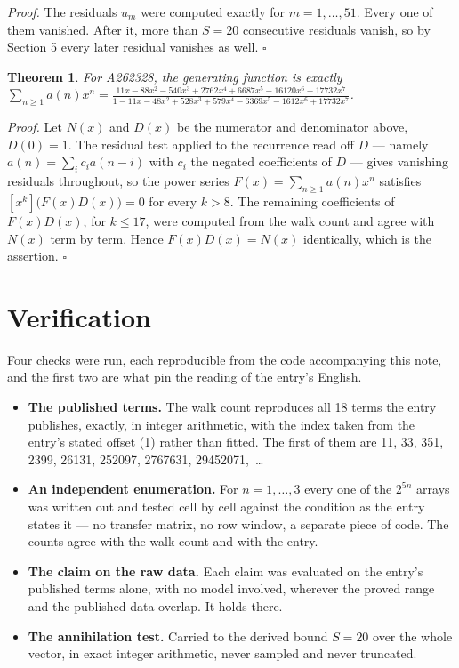 \documentclass[11pt]{article}
\newtheorem{theorem}{Theorem}
\theoremstyle{definition}
\begin{document}
{\itshape Proof.} The residuals $u_m$ were computed exactly for $m = 1,\dots,51$. Every one of them vanished. After it, more than $S = 20$ consecutive residuals vanish, so by Section 5 every later residual vanishes as well. $\square$

\begin{theorem} For A262328, the generating function is exactly $\sum_{n\ge 1} a(n)x^n = \frac{11x - 88x^{2} - 540x^{3} + 2762x^{4} + 6687x^{5} - 16120x^{6} - 17732x^{7}}{1 - 11x - 48x^{2} + 528x^{3} + 579x^{4} - 6369x^{5} - 1612x^{6} + 17732x^{7}}$.\end{theorem}

{\itshape Proof.} Let $N(x)$ and $D(x)$ be the numerator and denominator above, $D(0)=1$. The residual test applied to the recurrence read off $D$ --- namely $a(n) = \sum_i c_i a(n-i)$ with $c_i$ the negated coefficients of $D$ --- gives vanishing residuals throughout, so the power series $F(x)=\sum_{n\ge 1}a(n)x^n$ satisfies $[x^k]\bigl(F(x)D(x)\bigr) = 0$ for every $k > 8$. The remaining coefficients of $F(x)D(x)$, for $k \le 17$, were computed from the walk count and agree with $N(x)$ term by term. Hence $F(x)D(x) = N(x)$ identically, which is the assertion. $\square$

\section{Verification}

Four checks were run, each reproducible from the code accompanying this note, and the first two are what pin the reading of the entry's English.

\begin{itemize}

\item {\bfseries The published terms.} The walk count reproduces all 18 terms the entry publishes, exactly, in integer arithmetic, with the index taken from the entry's stated offset (1) rather than fitted. The first of them are 11, 33, 351, 2399, 26131, 252097, 2767631, 29452071,~\dots

\item {\bfseries An independent enumeration.} For $n = 1,\dots,3$ every one of the $2^{5n}$ arrays was written out and tested cell by cell against the condition as the entry states it --- no transfer matrix, no row window, a separate piece of code. The counts agree with the walk count and with the entry.

\item {\bfseries The claim on the raw data.} Each claim was evaluated on the entry's published terms alone, with no model involved, wherever the proved range and the published data overlap. It holds there.

\item {\bfseries The annihilation test.} Carried to the derived bound $S = 20$ over the whole vector, in exact integer arithmetic, never sampled and never truncated.

\end{itemize}
\end{document}

